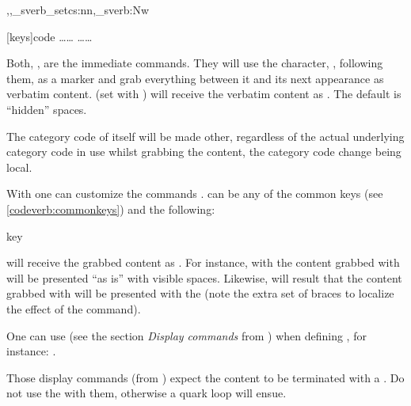 \documentclass[10pt]{article}
\begin{document}
\begin{codedescribe}{\cvSVerbSet,\cvSVerb,\codeverb_sverb_setcs:nn,\codeverb_sverb:Nw}
\begin{codesyntax}%
\tsmacro{\cvSVerbSet}[keys]{code}
 \ldots {}\ldots{}
 \ldots {}\ldots{}
\end{codesyntax}
Both, , are the immediate commands. They will use the character, , following them, as a marker and grab everything between it and its next appearance as verbatim content.  (set with ) will receive the verbatim content as . The default  is   ``hidden'' spaces.
\begin{tsremark}
  The category code of  itself will be made other, regardless of the actual underlying category code in use whilst grabbing the content, the category code change being local.
\end{tsremark}
With  one can customize the commands  .
  can be any of the common keys (see \ref{codeverb:commonkeys}) and the following:
 
 \begin{describelist*}{key}
 \end{describelist*}
 
  will receive the grabbed content as . For instance, with  the content grabbed with \tsobj{\csSVerb} will be presented ``as is'' with visible spaces. Likewise,  will result that the content grabbed with \tsobj{\csSVerb} will be presented with  the \tsobj{\ttfamily} (note the extra set of braces to localize the effect of the \tsobj{\ttfamily} command).
\end{codedescribe}
\begin{tsremark}  
  One can use  (see the section \emph{Display commands} from ) when defining , for instance: .
\end{tsremark}
\begin{tsremark}
  Those display commands (from ) expect the content to be terminated with a . Do not use the  with them, otherwise a quark loop will ensue.
\end{tsremark}
\end{document}
